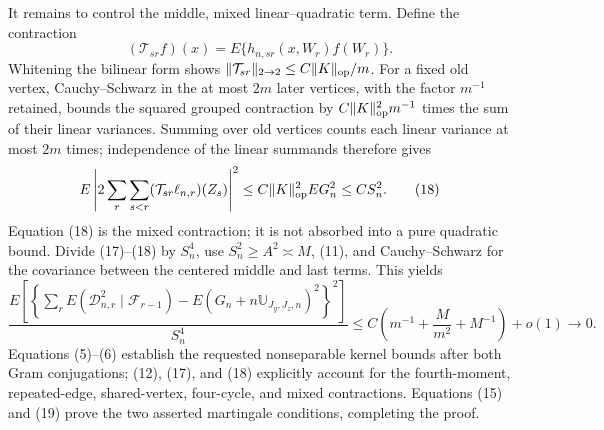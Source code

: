 It remains to control the middle, mixed linear--quadratic term.  Define the contraction
\[
(\mathcal T_{sr}f)(x)=E\{h_{n,sr}(x,W_r)f(W_r)\}.
\]
Whitening the bilinear form shows \(\|\mathcal T_{sr}\|_{2\to2}\le C\|K\|_{\rm op}/m\).  For a fixed old vertex, Cauchy--Schwarz in the at most \(2m\) later vertices, with the factor \(m^{-1}\) retained, bounds the squared grouped contraction by \(C\|K\|_{\rm op}^2m^{-1}\) times the sum of their linear variances.  Summing over old vertices counts each linear variance at most \(2m\) times; independence of the linear summands therefore gives
\[
E\left|2\sum_r\sum_{s<r}(\mathcal T_{sr}\ell_{n,r})(Z_s)\right|^2
\le C\|K\|_{\rm op}^2EG_n^2\le CS_n^2.                      \tag{18}
\]
Equation (18) is the mixed contraction; it is not absorbed into a pure quadratic bound.  Divide (17)--(18) by \(S_n^4\), use \(S_n^2\ge A^2\asymp M\), (11), and Cauchy--Schwarz for the covariance between the centered middle and last terms.  This yields
\[
\frac{E\left[\left\{\sum_rE(\mathcal D_{n,r}^2\mid\mathcal F_{r-1})
-E(G_n+n\mathbb U_{J_y,J_z,n})^2\right\}^2\right]}{S_n^4}
\le C\left(m^{-1}+\frac{M}{m^2}+M^{-1}\right)+o(1)\to0.      \tag{19}
\]
Equations (5)--(6) establish the requested nonseparable kernel bounds after both Gram conjugations; (12), (17), and (18) explicitly account for the fourth-moment, repeated-edge, shared-vertex, four-cycle, and mixed contractions.  Equations (15) and (19) prove the two asserted martingale conditions, completing the proof.
